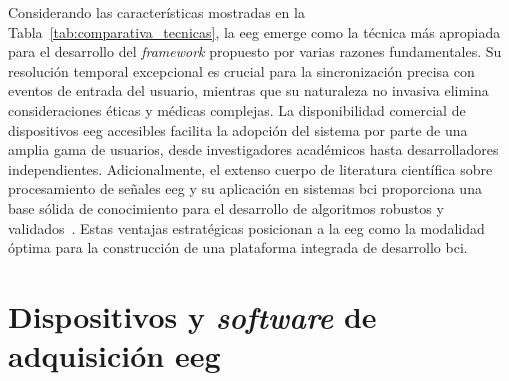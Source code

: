 \begin{table}[h!]
\centering
{}
\caption{Comparativa de técnicas de adquisición de señales cerebrales para aplicaciones BCI}
\label{tab:comparativa_tecnicas}
\end{table}

Considerando las características mostradas en la Tabla~\ref{tab:comparativa_tecnicas}, la \acrshort{eeg} emerge como la técnica más apropiada para el desarrollo del \textit{\gls{framework}} propuesto por varias razones fundamentales. Su resolución temporal excepcional es crucial para la sincronización precisa con eventos de entrada del usuario, mientras que su naturaleza no invasiva elimina consideraciones éticas y médicas complejas. La disponibilidad comercial de dispositivos \acrshort{eeg} accesibles facilita la adopción del sistema por parte de una amplia gama de usuarios, desde investigadores académicos hasta desarrolladores independientes. Adicionalmente, el extenso cuerpo de literatura científica sobre procesamiento de señales \acrshort{eeg} y su aplicación en sistemas \acrshort{bci} proporciona una base sólida de conocimiento para el desarrollo de algoritmos robustos y validados~\cite{lotte2007review,blankertz2010neurophysiological}. Estas ventajas estratégicas posicionan a la \acrshort{eeg} como la modalidad óptima para la construcción de una plataforma integrada de desarrollo \acrshort{bci}.

\section{Dispositivos y \textit{software} de adquisición \acrshort{eeg}}
\label{sec:dispositivos_software_eeg}

